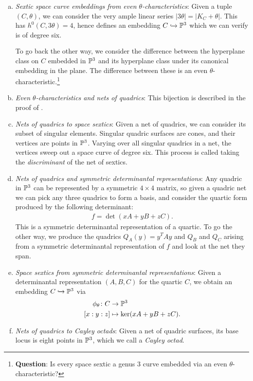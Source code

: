\documentclass[11pt]{amsart}
\begin{document}
\begin{enumerate}[(a)]
\item \textit{Sextic space curve embeddings from even $\theta$-characteristics}: Given a tuple $(C,\theta)$, we can consider the very ample linear series $|3\theta| = |K_C+\theta|$. This has $h^0(C,3\theta) = 4$, hence defines an embedding $C \hookto \P^3$ which we can verify is of degree six.

To go back the other way, we consider the difference between the hyperplane class on $C$ embedded in $\P^3$ and its hyperplane class under its canonical embedding in the plane. The difference between these is an even $\theta$-characteristic.\footnote{\textbf{Question}: Is every space sextic a genus $3$ curve embedded via an even $\theta$-characteristic?}

\item \textit{Even $\theta$-characteristics and nets of quadrics}: This bijection is described in the proof of \cite[6.3]{GrossHarris-theta}.


\item \textit{Nets of quadrics to space sextics}: Given a net of quadrics, we can consider its subset of singular elements. Singular quadric surfaces are cones, and their vertices are points in $\P^3$. Varying over all singular quadrics in a net, the vertices sweep out a space curve of degree six. This process is called taking the \textit{discriminant} of the net of sextics.

\item \textit{Nets of quadrics and symmetric determinantal representations}: Any quadric in $\P^3$ can be represented by a symmetric $4 \times 4$ matrix, so given a quadric net we can pick any three quadrics to form a basis, and consider the quartic form produced by the following determinant:
\begin{align*}
    f = \det(xA + yB + zC).
\end{align*}
This is a symmetric determinantal representation of a quartic. To go the other way, we produce the quadrics $Q_A(y) = y^T A y$ and $Q_B$ and $Q_C$ arising from a symmetric determinantal representation of $f$ and look at the net they span.


\item \textit{Space sextics from symmetric determinantal representations}: Given a determinantal representation $(A,B,C)$ for the quartic $C$, we obtain an embedding $C \hookto \P^3$ via
\begin{align*}
    \phi_\theta \colon C &\to \P^3 \\
    [x:y:z] &\mapsto \ker(xA+yB+zC).
\end{align*}
%
\item \textit{Nets of quadrics to Cayley octads}: Given a net of quadric surfaces, its base locus is eight points in $\P^3$, which we call a \textit{Cayley octad}.
\end{enumerate}
\end{document}
